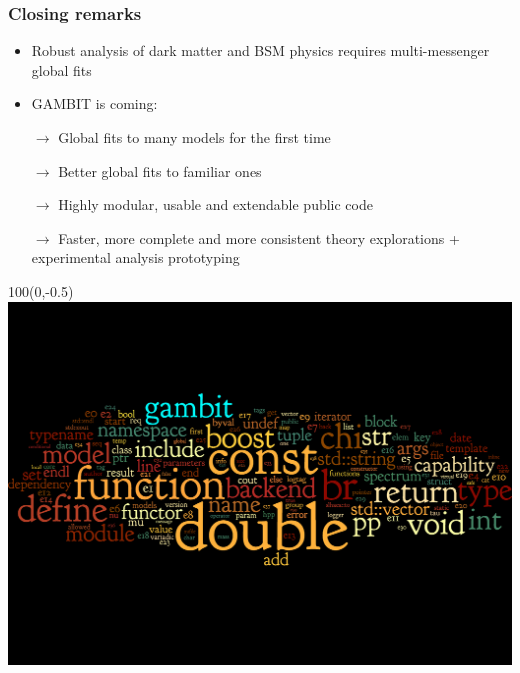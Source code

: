 \documentclass[xcolor=dvipsnames]{beamer}
\begin{document}
\begin{frame}
\frametitle{Closing remarks}

\begin{itemize}
\item{Robust analysis of dark matter and BSM physics requires multi-messenger global fits}
\item{GAMBIT is coming:}\bi
\item[$\rightarrow$]{Global fits to many models for the first time}
\item[$\rightarrow$]{Better global fits to familiar ones}
\item[$\rightarrow$]{Highly modular, usable and extendable public code}
\item[$\rightarrow$]{Faster, more complete and more consistent theory explorations + experimental analysis prototyping} 
\ei
\end{itemize}

\end{frame}

\begin{frame}

\begin{textblock}{100}(0,-0.5)
  \includegraphics[width=1.19\linewidth]{GAMBIT_wordle}
\end{textblock}

\end{frame}
\end{document}
